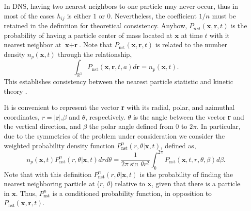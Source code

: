 In DNS, having two nearest neighbors to one particle may never occur, thus in most of the cases $h_{ij}$ is either $1$ or $0$. 
Nevertheless, the coefficient $1/n$ must be retained in the definition for theoretical consistency.
Anyhow, $P_{nst}(\textbf{x},\textbf{r},t)$ is the probability of having a particle center of mass located at $\textbf{x}$ at time $t$ with it nearest neighbor at $\textbf{x}+\textbf{r}$. 
Note that $P_\text{nst}(\textbf{x},\textbf{r},t)$ is related to the number density $n_p(\textbf{x},t)$ through the relationship, 
\begin{equation*}
    \int_{\mathbb{R}^3}
     P_\text{nst}(\textbf{x},\textbf{r},t,a) d\textbf{r}  = n_p(\textbf{x},t). 
    \label{eq:Pnst}
\end{equation*}
This establishes consistency between the nearest particle statistic and kinetic theory \citep{zhang2021ensemble}. 


It is convenient to represent the vector \textbf{r} with its radial, polar, and azimuthal coordinates,  $r = |\textbf{r}|$,$\beta$ and $\theta$, respectively. $\theta$ is the angle between the vector \textbf{r} and the vertical direction, and $\beta$ the polar angle defined from $0$ to $2\pi$. In particular, due to the symmetries of the problem under consideration we consider the weighted probability density function $P_\text{nst}^n(r,\theta|\textbf{x},t)$, defined as, 
\begin{equation}
    n_p(\textbf{x},t) P_\text{nst}^n(r,\theta|\textbf{x},t)dr d\theta 
    =\frac{1}{2\pi \sin\theta r^2 }
    \int_0^{2\pi}
    P_\text{nst}(\textbf{x},t,r,\theta,\beta) 
    d\beta.
    \label{eq:Ptheta_r}
\end{equation}
Note that with this definition $P_\text{nst}^n(r,\theta|\textbf{x},t)$ is the probability of finding the nearest neighboring particle at ($r$, $\theta$) relative to \textbf{x}, given that there is a particle in $\textbf{x}$. 
Thus, $P_\text{nst}^n$ is a conditioned probability function, in opposition to $P_\text{nst}(\textbf{x},\textbf{r},t)$. 

